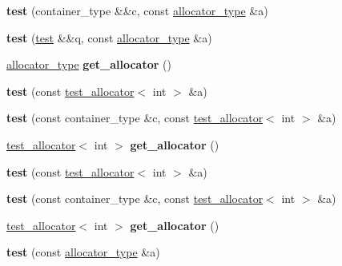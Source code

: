 \begin{DoxyCompactItemize}
{\bfseries test} (container\+\_\+type \&\&c, const \mbox{\hyperlink{classtest__allocator}{allocator\+\_\+type}} \&a)
\item 
\mbox{\label{structtest_af196249915ea3bdf67539228ebab8fd6}} 
{\bfseries test} (\mbox{\hyperlink{structtest}{test}} \&\&q, const \mbox{\hyperlink{classtest__allocator}{allocator\+\_\+type}} \&a)
\item 
\mbox{\label{structtest_ac118a5169aefd32532363da721910981}} 
\mbox{\hyperlink{classtest__allocator}{allocator\+\_\+type}} {\bfseries get\+\_\+allocator} ()
\item 
\mbox{\label{structtest_a6cbe38c39948288cef13b3f05a759671}} 
{\bfseries test} (const \mbox{\hyperlink{classtest__allocator}{test\+\_\+allocator}}$<$ int $>$ \&a)
\item 
\mbox{\label{structtest_aa241f742953766be8d79e4f2d0b97be5}} 
{\bfseries test} (const container\+\_\+type \&c, const \mbox{\hyperlink{classtest__allocator}{test\+\_\+allocator}}$<$ int $>$ \&a)
\item 
\mbox{\label{structtest_a2c31ee85ae81b89114b3f14daca091cb}} 
\mbox{\hyperlink{classtest__allocator}{test\+\_\+allocator}}$<$ int $>$ {\bfseries get\+\_\+allocator} ()
\item 
\mbox{\label{structtest_a6cbe38c39948288cef13b3f05a759671}} 
{\bfseries test} (const \mbox{\hyperlink{classtest__allocator}{test\+\_\+allocator}}$<$ int $>$ \&a)
\item 
\mbox{\label{structtest_aa241f742953766be8d79e4f2d0b97be5}} 
{\bfseries test} (const container\+\_\+type \&c, const \mbox{\hyperlink{classtest__allocator}{test\+\_\+allocator}}$<$ int $>$ \&a)
\item 
\mbox{\label{structtest_a2c31ee85ae81b89114b3f14daca091cb}} 
\mbox{\hyperlink{classtest__allocator}{test\+\_\+allocator}}$<$ int $>$ {\bfseries get\+\_\+allocator} ()
\item 
\mbox{\label{structtest_a4ecc4aa80f049dc8824bfe0f4ec1bfcb}} 
{\bfseries test} (const \mbox{\hyperlink{classtest__allocator}{allocator\+\_\+type}} \&a)

\end{DoxyCompactItemize}

